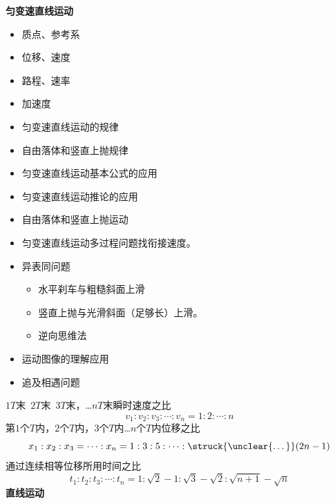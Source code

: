 \textbf{匀变速直线运动}
\begin{itemize}
  \item 质点、参考系
  \item 位移、速度
  \item 路程、速率
  \item 加速度
\end{itemize}
\begin{itemize}
  \item 匀变速直线运动的规律
  \item 自由落体和竖直上抛规律
\end{itemize}
\begin{itemize}
  \item 匀变速直线运动基本公式的应用
  \item 匀变速直线运动推论的应用
  \item 自由落体和竖直上抛运动
  \item 匀变速直线运动多过程问题\quad 找衔接速度。
  \item 异表同问题
  \begin{itemize}
    \item 水平刹车与粗糙斜面上滑
    \item 竖直上抛与光滑斜面（足够长）上滑。
    \item 逆向思维法
  \end{itemize}
  \item 运动图像的理解应用
  \item 追及相遇问题
\end{itemize}
$1T$末\ $2T$末\ $3T$末，…$nT$末瞬时速度之比
\[ v_1:v_2:v_3:\cdots:v_n=1:2:\cdots:n \]
第$1$个$T$内，$2$个$T$内，$3$个$T$内…$n$个$T$内位移之比
\[ x_1:x_2:x_3=\cdots:x_n=1:3:5:\cdots:\text{\struck{\unclear{…}}}(2n-1) \] %
通过连续相等位移所用时间之比
\[ t_1:t_2:t_3:\cdots:t_n=1:\sqrt{2}-1:\sqrt{3}-\sqrt{2}:\sqrt{n+1}-\sqrt{n} \] %
\textbf{直线运动}

